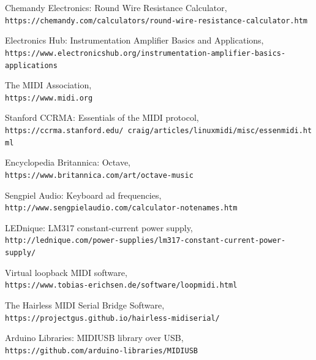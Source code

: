 \documentclass{article}
\begin{document}
\newpage
\begin{thebibliography}{9}

Chemandy Electronics: Round Wire Resistance Calculator,
\\\texttt{https://chemandy.com/calculators/round-wire-resistance-calculator.htm}

Electronics Hub: Instrumentation Amplifier Basics and Applications,
\\\texttt{https://www.electronicshub.org/instrumentation-amplifier-basics-applications}

The MIDI Association,
\\\texttt{https://www.midi.org}

Stanford CCRMA: Essentials of the MIDI protocol,
\\\texttt{https://ccrma.stanford.edu/~craig/articles/linuxmidi/misc/essenmidi.html}

Encyclopedia Britannica: Octave,
\\\texttt{https://www.britannica.com/art/octave-music}

Sengpiel Audio: Keyboard ad frequencies,
\\\texttt{http://www.sengpielaudio.com/calculator-notenames.htm}

LEDnique: LM317 constant-current power supply,
\\\texttt{http://lednique.com/power-supplies/lm317-constant-current-power-supply/}

Virtual loopback MIDI software,
\\\texttt{https://www.tobias-erichsen.de/software/loopmidi.html}

The Hairless MIDI Serial Bridge Software,
\\\texttt{https://projectgus.github.io/hairless-midiserial/}

Arduino Libraries: MIDIUSB library over USB,
\\\texttt{https://github.com/arduino-libraries/MIDIUSB}

\end{thebibliography}
\end{document}
